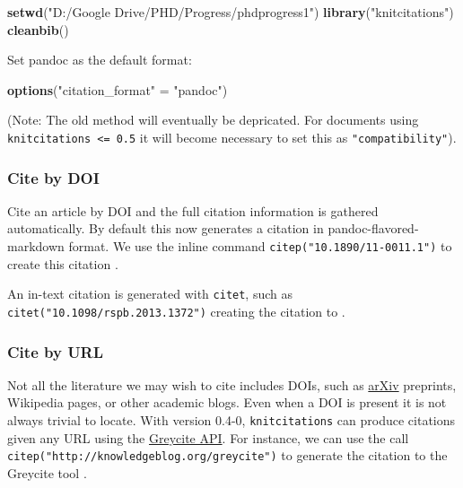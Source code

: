 \documentclass[]{article}
\newenvironment{Shaded}{\begin{snugshade}}{\end{snugshade}}
\newcommand{\KeywordTok}[1]{\textcolor[rgb]{0.13,0.29,0.53}{\textbf{{#1}}}}
\newcommand{\StringTok}[1]{\textcolor[rgb]{0.31,0.60,0.02}{{#1}}}
\newcommand{\NormalTok}[1]{{#1}}
\begin{document}
\begin{Shaded}
\begin{Highlighting}[]
\KeywordTok{setwd}\NormalTok{(}\StringTok{"D:/Google Drive/PHD/Progress/phdprogress1"}\NormalTok{)}
\KeywordTok{library}\NormalTok{(}\StringTok{"knitcitations"}\NormalTok{)}
\KeywordTok{cleanbib}\NormalTok{()}
\end{Highlighting}
\end{Shaded}

Set pandoc as the default format:

\begin{Shaded}
\begin{Highlighting}[]
\KeywordTok{options}\NormalTok{(}\StringTok{"citation_format"} \NormalTok{=}\StringTok{ "pandoc"}\NormalTok{)}
\end{Highlighting}
\end{Shaded}

(Note: The old method will eventually be depricated. For documents using
\texttt{knitcitations\ \textless{}=\ 0.5} it will become necessary to
set this as \texttt{"compatibility"}).

\subsubsection{Cite by DOI}\label{cite-by-doi}

Cite an article by DOI and the full citation information is gathered
automatically. By default this now generates a citation in
pandoc-flavored-markdown format. We use the inline command
\texttt{citep("10.1890/11-0011.1")} to create this citation
\citep{Abrams_2012}.

An in-text citation is generated with \texttt{citet}, such as
\texttt{citet("10.1098/rspb.2013.1372")} creating the citation to
\citet{Boettiger_2013}.

\subsubsection{Cite by URL}\label{cite-by-url}

Not all the literature we may wish to cite includes DOIs, such as
\href{http://arxiv.org}{arXiv} preprints, Wikipedia pages, or other
academic blogs. Even when a DOI is present it is not always trivial to
locate. With version 0.4-0, \texttt{knitcitations} can produce citations
given any URL using the
\href{http://greycite.knowledgeblog.org}{Greycite API}. For instance, we
can use the call \texttt{citep("http://knowledgeblog.org/greycite")} to
generate the citation to the Greycite tool \citep{greycite32194}.
\end{document}
